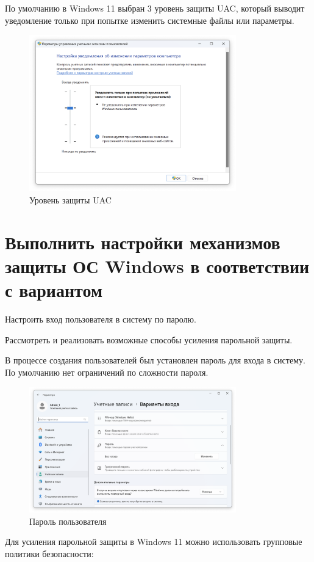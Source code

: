 \documentclass[a4paper, 14pt]{report}
\begin{document}
По умолчанию в Windows 11 выбран 3 уровень защиты UAC, который выводит уведомление только при попытке изменить системные файлы или параметры.
\begin{figure}[H]
    \centering
    \includegraphics[width=0.8\textwidth]{../images/uac_level.png}
    \caption{Уровень защиты UAC}
\end{figure}

\section{Выполнить настройки механизмов защиты ОС Windows в соответствии с вариантом}
\begin{tcolorbox}[colback=white!95!gray, colframe=black, title=Вариант 1]
    Настроить вход пользователя в систему по паролю.

    Рассмотреть и реализовать возможные способы усиления парольной защиты.
\end{tcolorbox}
В процессе создания пользователей был установлен пароль для входа в систему.
По умолчанию нет ограничений по сложности пароля.
\begin{figure}[H]
    \centering
    \includegraphics[width=0.8\textwidth]{../images/password_settings.png}
    \caption{Пароль пользователя}
\end{figure}
Для усиления парольной защиты в Windows 11 можно использовать групповые политики безопасности:
\end{document}
